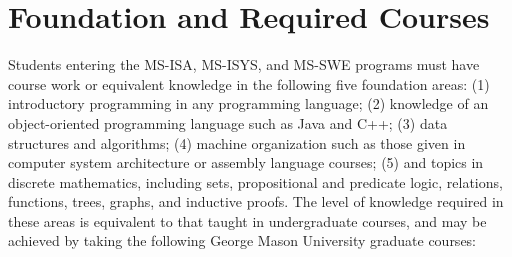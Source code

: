 \documentclass[oneside,11pt]{memoir}
\begin{document}







\chapter{Foundation and Required Courses}

Students entering the MS-ISA, MS-ISYS, and MS-SWE programs must have course work or equivalent knowledge in the following five foundation areas: (1) introductory programming in any programming language; (2) knowledge of an object-oriented programming language such as Java and C++; (3) data structures and algorithms; (4) machine organization such as those given in computer system architecture or assembly language courses; (5) and topics in discrete mathematics, including sets, propositional and predicate logic,  relations, functions, trees, graphs, and inductive proofs. The level of knowledge required in these areas is equivalent to that taught in undergraduate courses, and may be achieved by taking the following George Mason University graduate courses:
\end{document}
